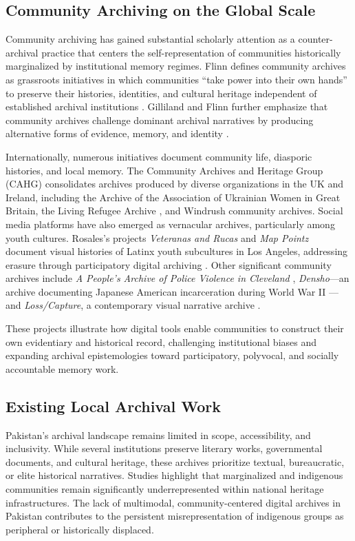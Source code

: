 \subsection{Community Archiving on the Global Scale}
Community archiving has gained substantial scholarly attention as a counter-archival practice that centers the self-representation of communities historically marginalized by institutional memory regimes. Flinn defines community archives as grassroots initiatives in which communities “take power into their own hands” to preserve their histories, identities, and cultural heritage independent of established archival institutions \cite{flinn2011}. Gilliland and Flinn further emphasize that community archives challenge dominant archival narratives by producing alternative forms of evidence, memory, and identity \cite{gilliland2013}.

Internationally, numerous initiatives document community life, diasporic histories, and local memory. The Community Archives and Heritage Group (CAHG) \cite{cahg} consolidates archives produced by diverse organizations in the UK and Ireland, including the Archive of the Association of Ukrainian Women in Great Britain, the Living Refugee Archive \cite{livingrefugee}, and Windrush community archives. Social media platforms have also emerged as vernacular archives, particularly among youth cultures. Rosales’s projects \textit{Veteranas and Rucas} and \textit{Map Pointz} document visual histories of Latinx youth subcultures in Los Angeles, addressing erasure through participatory digital archiving \cite{rosalesproject}. Other significant community archives include \textit{A People’s Archive of Police Violence in Cleveland} \cite{archivingpoliceviolence}, \textit{Densho}—an archive documenting Japanese American incarceration during World War II \cite{densho}—and \textit{Loss/Capture}, a contemporary visual narrative archive \cite{losscapture}.

These projects illustrate how digital tools enable communities to construct their own evidentiary and historical record, challenging institutional biases and expanding archival epistemologies toward participatory, polyvocal, and socially accountable memory work.

\subsection{Existing Local Archival Work}
Pakistan’s archival landscape remains limited in scope, accessibility, and inclusivity. While several institutions preserve literary works, governmental documents, and cultural heritage, these archives prioritize textual, bureaucratic, or elite historical narratives. Studies highlight that marginalized and indigenous communities remain significantly underrepresented within national heritage infrastructures. The lack of multimodal, community-centered digital archives in Pakistan contributes to the persistent misrepresentation of indigenous groups as peripheral or historically displaced.

